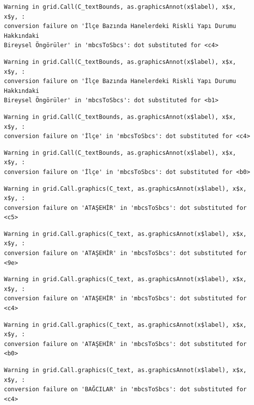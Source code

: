 \documentclass[
  11pt,
  a4paper,
  DIV=11,
  numbers=noendperiod]{scrartcl}
\begin{document}
\begin{verbatim}
Warning in grid.Call(C_textBounds, as.graphicsAnnot(x$label), x$x, x$y, :
conversion failure on 'İlçe Bazında Hanelerdeki Riskli Yapı Durumu Hakkındaki
Bireysel Öngörüler' in 'mbcsToSbcs': dot substituted for <c4>
\end{verbatim}

\begin{verbatim}
Warning in grid.Call(C_textBounds, as.graphicsAnnot(x$label), x$x, x$y, :
conversion failure on 'İlçe Bazında Hanelerdeki Riskli Yapı Durumu Hakkındaki
Bireysel Öngörüler' in 'mbcsToSbcs': dot substituted for <b1>
\end{verbatim}

\begin{verbatim}
Warning in grid.Call(C_textBounds, as.graphicsAnnot(x$label), x$x, x$y, :
conversion failure on 'İlçe' in 'mbcsToSbcs': dot substituted for <c4>
\end{verbatim}

\begin{verbatim}
Warning in grid.Call(C_textBounds, as.graphicsAnnot(x$label), x$x, x$y, :
conversion failure on 'İlçe' in 'mbcsToSbcs': dot substituted for <b0>
\end{verbatim}

\begin{verbatim}
Warning in grid.Call.graphics(C_text, as.graphicsAnnot(x$label), x$x, x$y, :
conversion failure on 'ATAŞEHİR' in 'mbcsToSbcs': dot substituted for <c5>
\end{verbatim}

\begin{verbatim}
Warning in grid.Call.graphics(C_text, as.graphicsAnnot(x$label), x$x, x$y, :
conversion failure on 'ATAŞEHİR' in 'mbcsToSbcs': dot substituted for <9e>
\end{verbatim}

\begin{verbatim}
Warning in grid.Call.graphics(C_text, as.graphicsAnnot(x$label), x$x, x$y, :
conversion failure on 'ATAŞEHİR' in 'mbcsToSbcs': dot substituted for <c4>
\end{verbatim}

\begin{verbatim}
Warning in grid.Call.graphics(C_text, as.graphicsAnnot(x$label), x$x, x$y, :
conversion failure on 'ATAŞEHİR' in 'mbcsToSbcs': dot substituted for <b0>
\end{verbatim}

\begin{verbatim}
Warning in grid.Call.graphics(C_text, as.graphicsAnnot(x$label), x$x, x$y, :
conversion failure on 'BAĞCILAR' in 'mbcsToSbcs': dot substituted for <c4>
\end{verbatim}
\end{document}
